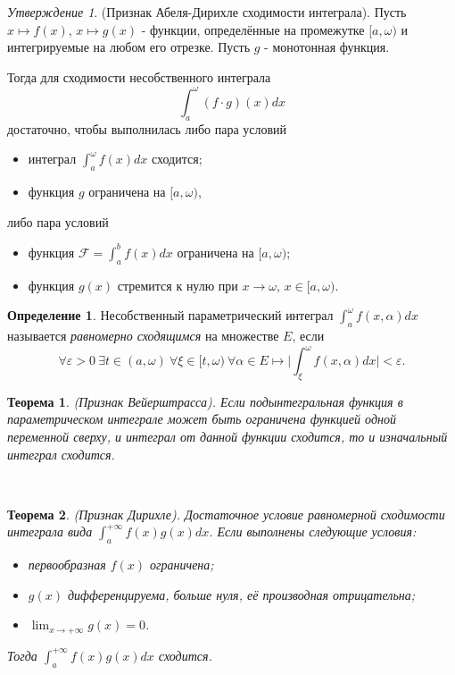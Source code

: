 \documentclass[a4paper,100pt]{article}
\theoremstyle{indented}
\newtheorem{theorem}{Теорема}
\theoremstyle{definition}
\newtheorem{defn}{Определение}
\theoremstyle{remark}
\newtheorem{stat}{Утверждение}
\begin{document}
\begin{stat}
    (Признак Абеля-Дирихле сходимости интеграла). Пусть $x\mapsto f(x)$, $x\mapsto g(x)$ - функции, определённые на промежутке $[a, \omega)$ и интегрируемые на любом его отрезке. Пусть $g$ - монотонная функция. \ 

    Тогда для сходимости несобственного интеграла
    \[
        \int_a^\omega (f\cdot g)(x)dx
    \]
    достаточно, чтобы выполнилась либо пара условий

    \begin{itemize}
        \item интеграл $\int_a^\omega f(x)dx$ сходится;
        \item функция $g$ ограничена на $[a, \omega)$,
    \end{itemize}

    либо пара условий

    \begin{itemize}
        \item функция $\mathcal{F}=\int_a^b f(x)dx$ ограничена на $[a, \omega)$; 
        \item функция $g(x)$ стремится к нулю при $x\rightarrow \omega$, $x\in [a, \omega)$.
    \end{itemize}
\end{stat}

\begin{defn}
    Несобственный параметрический интеграл $\int_a^\omega f(x, \alpha)dx$ называется \textit{равномерно сходящимся} на множестве $E$, если
    \[
        \forall \varepsilon >0 \: \exists t\in (a, \omega) \: \forall \xi \in [t, \omega) \: \forall \alpha \in E \mapsto \bigg| \int_\xi^\omega f(x, \alpha)dx\bigg|<\varepsilon.
    \]
\end{defn}

\begin{theorem}
    (Признак Вейерштрасса). Если подынтегральная функция в параметрическом интеграле может быть ограничена функцией одной переменной сверху, и интеграл от данной функции сходится, то и изначальный интеграл сходится.
\end{theorem} \

\begin{theorem}
    (Признак Дирихле). Достаточное условие равномерной сходимости интеграла вида $\int_a^{+\infty}f(x)g(x)dx$. Если выполнены следующие условия: 

    \begin{itemize}
        \item первообразная $f(x)$ ограничена; 
        \item $g(x)$ дифференцируема, больше нуля, её производная отрицательна; 
        \item $\lim_{x\rightarrow +\infty} g(x)=0$. 
    \end{itemize}

    Тогда $\int_a^{+\infty}f(x)g(x)dx$ сходится.
\end{theorem} \ 
\end{document}
